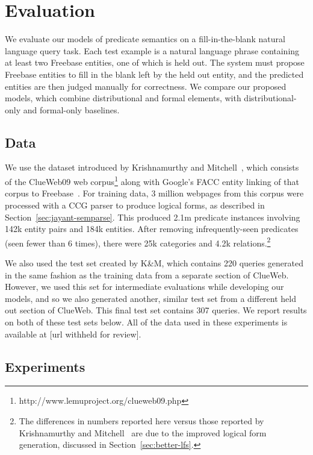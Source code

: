 \documentclass[11pt]{article}
\newcommand{\secref}[1]{Section~\ref{sec:#1}}
\begin{document}
\section{Evaluation}
\label{sec:evaluation}

We evaluate our models of predicate semantics on a fill-in-the-blank natural
language query task.  Each test example is a natural language phrase containing
at least two Freebase entities, one of which is held out.  The system must
propose Freebase entities to fill in the blank left by the held out entity, and
the predicted entities are then judged manually for correctness.  We compare
our proposed models, which combine distributional and formal elements, with
distributional-only and formal-only baselines.

\subsection{Data}

We use the dataset introduced by Krishnamurthy and
Mitchell~, which
consists of the ClueWeb09 web
corpus\footnote{http://www.lemuproject.org/clueweb09.php} along with Google's
FACC entity linking of that corpus to
Freebase~\cite{gabrilovich-2013-clueweb-entity-linking}.  For training data, 3
million webpages from this corpus were processed with a CCG parser to produce
logical forms, as described in \secref{jayant-semparse}.  This produced 2.1m
predicate instances involving 142k entity pairs and 184k entities.  After
removing infrequently-seen predicates (seen fewer than 6 times), there were 25k
categories and 4.2k relations.\footnote{The differences in numbers reported
here versus those reported by Krishnamurthy and
Mitchell~ are due to the
improved logical form generation, discussed in \secref{better-lfs}.}

We also used the test set created by K\&M, which contains
220 queries generated in the same fashion as the training data from a separate
section of ClueWeb.  However, we used this set for intermediate evaluations
while developing our models, and so we also generated another, similar test set
from a different held out section of ClueWeb.  This final test set contains 307
queries.  We report results on both of these test sets below.  All of the data
used in these experiments is available at [url withheld for review].

\subsection{Experiments}
\end{document}
